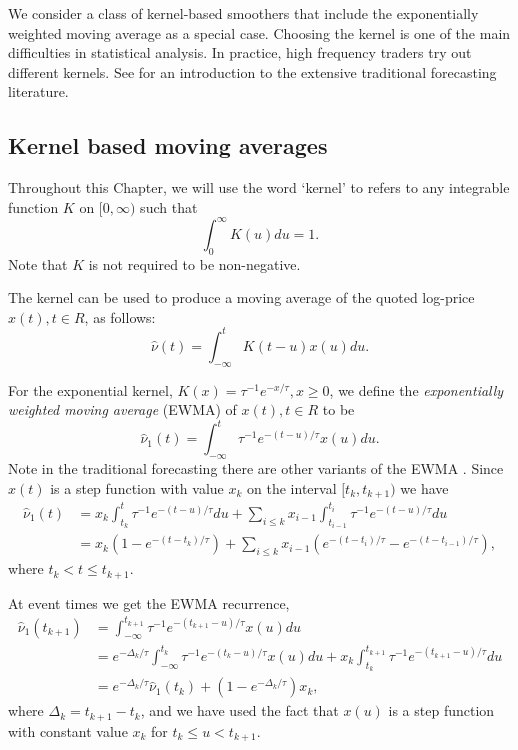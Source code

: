 We consider a class of kernel-based smoothers that include the exponentially weighted moving average as a special case. Choosing the kernel is one of the main difficulties in statistical analysis. In practice, high frequency traders try out different kernels. See \citet{brown2004smoothing} for an introduction to the extensive traditional forecasting literature.
\subsection{Kernel based moving averages}
Throughout this Chapter, we will use the word `kernel' to refers to any integrable function $K$ on $[0,\infty)$ such that 
\begin{equation}\label{eq:kernelDef}
\int_0^\infty K(u) du = 1.
\end{equation}
Note that $K$ is not required to be non-negative.

The kernel can be used to produce a moving average of the quoted log-price $x(t), t \in R$, as follows:
$$ \hat{\nu}(t) = \int_{-\infty}^t K(t-u) x(u) du.$$
 
For the exponential kernel, $K(x) = \tau^{-1}e^{-x/\tau}, x \geqslant 0$, we define the \emph{exponentially weighted moving average} (EWMA) of $x(t), t \in R$ to be
$$ \hat{\nu}_1(t) = \int_{-\infty}^t \tau^{-1} e^{-(t-u)/\tau} x(u) du.$$
Note in the traditional forecasting there are other variants of the EWMA \citep{gardner2006exponential}.
Since $x(t)$ is a step function with value $x_k$ on the interval $[t_k,t_{k+1})$ we have
\begin{align}\label{EWMAint} \hat{\nu}_1(t) &= x_k \int_{t_k}^t \tau^{-1} e^{-(t-u)/\tau} du + \sum_{i \leqslant k}x_{i-1} \int_{t_{i-1}}^{t_i} \tau^{-1} e^{-(t-u)/\tau} du \nonumber\\
&= x_k \left(1 - e^{-(t-t_k)/\tau}\right) +  \sum_{i \leqslant k}x_{i-1} \left(e^{-(t-t_{i})/\tau} - e^{-(t-t_{i-1})/\tau}\right),
\end{align}
where $t_{k} < t \leqslant t_{k+1}$.

At event times we get the EWMA recurrence,
\begin{align}\label{eq:EWMArecurrence}
\hat{\nu}_1(t_{k+1}) &= \int_{-\infty}^{t_{k+1}} \tau^{-1} e^{-(t_{k+1} -u)/\tau} x(u) du \nonumber \\
&= e^{-\Delta_k/\tau} \int_{-\infty}^{t_k} \tau^{-1} e^{-(t_k -u)/\tau} x(u) du + 
x_k \int_{t_k}^{t_{k+1}} \tau^{-1} e^{-(t_{k+1} -u)/\tau} du \nonumber \\
&= e^{-\Delta_k/\tau} \hat{\nu}_1(t_{k}) + (1-e^{-\Delta_k/\tau}) x_k,
\end{align}
where $\Delta_k = t_{k+1} - t_{k}$, and we have used the fact that $x(u)$ is a step function with constant value $x_k$ for $t_k \leqslant u < t_{k+1}.$

